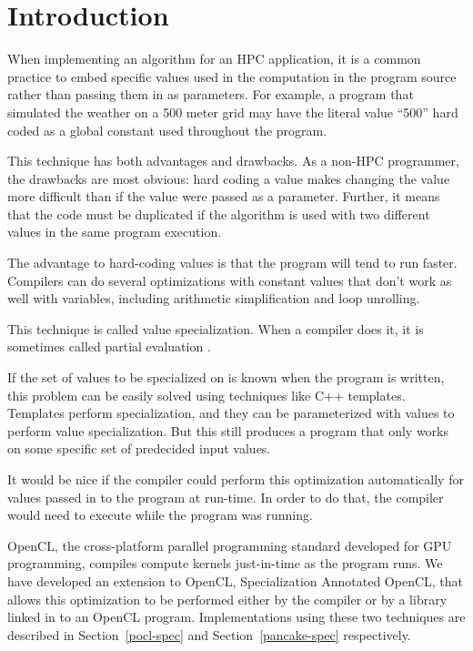 \documentclass{acm_proc_article-sp}
\begin{document}

\section{Introduction}

When implementing an algorithm for an HPC application, it is a common practice
to embed specific values used in the computation in the program source rather
than passing them in as parameters. For example, a program that simulated the
weather on a 500 meter grid may have the literal value ``500'' hard coded as a
global constant used throughout the program.

This technique has both advantages and drawbacks. As a non-HPC programmer, the
drawbacks are most obvious: hard coding a value makes changing the value more
difficult than if the value were passed as a parameter. Further, it means that
the code must be duplicated if the algorithm is used with two different values
in the same program execution. 

The advantage to hard-coding values is that the program will tend to run faster.
Compilers can do several optimizations with constant values that don't work as
well with variables, including arithmetic simplification and loop unrolling.

This technique is called value specialization. When a compiler does it, it is
sometimes called partial evaluation \cite{Futamura:1971:PE}.

If the set of values to be specialized on is known when the program is written,
this problem can be easily solved using techniques like C++ templates.
Templates perform specialization, and they can be parameterized with values to
perform value specialization. But this still produces a program that only works
on some specific set of predecided input values.

It would be nice if the compiler could perform this optimization automatically
for values passed in to the program at run-time. In order to do that, the compiler
would need to execute while the program was running.

OpenCL, the cross-platform parallel programming standard developed for GPU
programming, compiles compute kernels just-in-time as the program runs. We have
developed an extension to OpenCL, Specialization Annotated OpenCL, that allows
this optimization to be performed either by the compiler or by a library linked
in to an OpenCL program. Implementations using these two techniques are
described in Section~\ref{pocl-spec} and Section~\ref{pancake-spec}
respectively.
\end{document}
